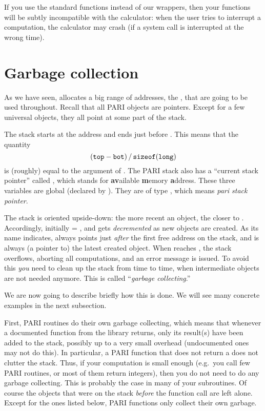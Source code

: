 If you use the standard  functions instead of our wrappers, then
your functions will be subtly incompatible with the  calculator: when
the user tries to interrupt a computation, the calculator may crash
(if a system call is interrupted at the wrong time).

\section{Garbage collection}\label{se:garbage}


\noindent
As we have seen,  allocates a big range of
addresses, the , that are going to be used throughout. Recall
that all PARI objects are pointers. Except for a few universal objects,
they all point at some part of the stack.

The stack starts at the address  and ends just before . This
means that the quantity
%
$$ ({\tt top} - {\tt bot})\,/\,{\tt sizeof(long)} $$
%
is (roughly) equal to the  argument of . The PARI
stack also has a ``current stack pointer'' called , which stands
for {\bf av}ailable {\bf m}emory {\bf a}ddress. These three variables are
global (declared by ). They are of type , which
means \emph{pari stack pointer}.

The stack is oriented upside-down: the more recent an object, the closer to
. Accordingly, initially  = , and  gets
\emph{decremented} as new objects are created. As its name indicates,
 always points just \emph{after} the first free address on the
stack, and  is always (a pointer to) the latest created object.
When  reaches , the stack overflows, aborting all
computations, and an error message is issued. To avoid this \emph{you}
need to clean up the stack from time to time, when intermediate objects are
not needed anymore. This is called ``\emph{garbage collecting}.''

We are now going to describe briefly how this is done. We will see many
concrete examples in the next subsection.

\noindent\item
First, PARI routines do their own garbage collecting, which means that
whenever a documented function from the library returns, only its result(s)
have been added to the stack, possibly up to a very small overhead
(undocumented ones may not do this). In
particular, a PARI function that does not return a  does not clutter
the stack. Thus, if your computation is small enough (e.g.~you call few PARI
routines, or most of them return  integers), then you do not need
to do any garbage collecting. This is probably the case in many of your
subroutines. Of course the objects that were on the stack \emph{before} the
function call are left alone. Except for the ones listed below, PARI
functions only collect their own garbage.

